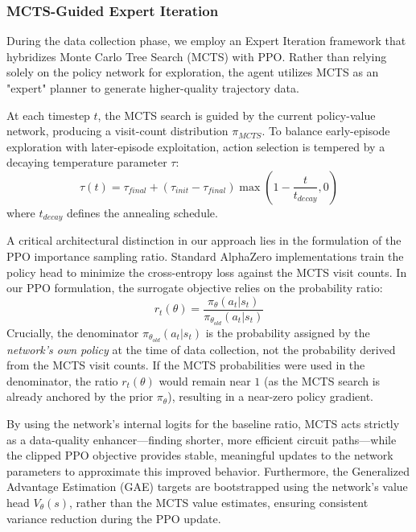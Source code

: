 \documentclass{article} %
\begin{document}
\subsubsection{MCTS-Guided Expert Iteration}
During the data collection phase, we employ an Expert Iteration framework that hybridizes Monte Carlo Tree Search (MCTS) with PPO. Rather than relying solely on the policy network for exploration, the agent utilizes MCTS as an "expert" planner to generate higher-quality trajectory data. 

At each timestep $t$, the MCTS search is guided by the current policy-value network, producing a visit-count distribution $\pi_{MCTS}$. To balance early-episode exploration with later-episode exploitation, action selection is tempered by a decaying temperature parameter $\tau$:
$$
\tau(t) = \tau_{final} + (\tau_{init} - \tau_{final}) \max \left(1 - \frac{t}{t_{decay}}, 0 \right)
$$
where $t_{decay}$ defines the annealing schedule.

A critical architectural distinction in our approach lies in the formulation of the PPO importance sampling ratio. Standard AlphaZero implementations train the policy head to minimize the cross-entropy loss against the MCTS visit counts. In our PPO formulation, the surrogate objective relies on the probability ratio:
$$
r_t(\theta) = \frac{\pi_{\theta}(a_t|s_t)}{\pi_{\theta_{old}}(a_t|s_t)}
$$
Crucially, the denominator $\pi_{\theta_{old}}(a_t|s_t)$ is the probability assigned by the \textit{network's own policy} at the time of data collection, not the probability derived from the MCTS visit counts. If the MCTS probabilities were used in the denominator, the ratio $r_t(\theta)$ would remain near $1$ (as the MCTS search is already anchored by the prior $\pi_\theta$), resulting in a near-zero policy gradient. 

By using the network's internal logits for the baseline ratio, MCTS acts strictly as a data-quality enhancer—finding shorter, more efficient circuit paths—while the clipped PPO objective provides stable, meaningful updates to the network parameters to approximate this improved behavior. Furthermore, the Generalized Advantage Estimation (GAE) targets are bootstrapped using the network's value head $V_\theta(s)$, rather than the MCTS value estimates, ensuring consistent variance reduction during the PPO update.
\end{document}
